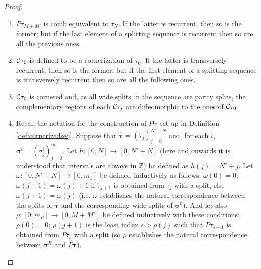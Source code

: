 \begin{proof}
\begin{enumerate}
\item $P\tau_{M+M'}$ is comb equivalent to $\tau_N$. If the latter is recurrent, then so is the former; but if the last element of a splitting sequence is recurrent then so are all the previous ones.

\item ${\mathcal C}\tau_0$ is defined to be a cornerization of $\tau_0$. If the latter is transversely recurrent, then so is the former; but if the first element of a splitting sequence is transversely recurrent then so are all the following ones.

\item ${\mathcal C}\tau_0$ is cornered and, as all wide splits in the sequence are parity splits, the complementary regions of each ${\mathcal C}\tau_j$ are diffeomorphic to the ones of ${\mathcal C}\tau_0$.

\item Recall the notation for the construction of $P\bm\tau$ set up in Definition \ref{def:cornerizedseq}. Suppose that $\bm{\hat\tau}=(\hat\tau_j)_{j=0}^{N'+N}$ and, for each $i$, $\bm\sigma^i=(\sigma^i_j)_{j=0}^{m_i}$. Let $h:[0,N]\rightarrow [0,N'+N]$ (here and onwards it is understood that intervals are always in $\mathbb Z$) be defined as $h(j)=N'+j$. Let $\omega:[0,N'+N]\rightarrow [0,m_1]$ be defined inductively as follows: $\omega(0)=0$; $\omega(j+1)=\omega(j)+1$ if $\hat\tau_{j+1}$ is obtained from $\hat\tau_j$ with a split, else $\omega(j+1)=\omega(j)$ (i.e. $\omega$ establishes the natural correspondence between the splits of $\bm{\hat\tau}$ and the corresponding wide splits of $\bm\sigma^0$). And let also $\rho: [0,m_R]\rightarrow [0,M+M']$ be defined inductively with these conditions: $\rho(0)=0$; $\rho(j+1)$ is the least index $s>\rho(j)$ such that $P\tau_{s+1}$ is obtained from $P\tau_s$ with a split (so $\rho$ establishes the natural correspondence between $\bm\sigma^R$ and $P\bm\tau$).


\end{enumerate}
\end{proof}
